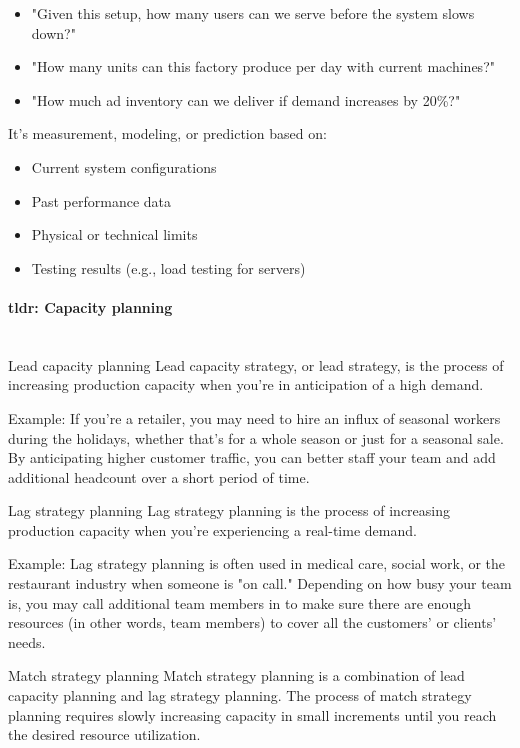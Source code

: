 \documentclass{article}
\begin{document}
\begin{itemize}
\item "Given this setup, how many users can we serve before the system slows down?"
\item "How many units can this factory produce per day with current machines?"
\item "How much ad inventory can we deliver if demand increases by 20\%?"
\end{itemize}

It's measurement, modeling, or prediction based on:

\begin{itemize}
\item Current system configurations
\item Past performance data
\item Physical or technical limits
\item Testing results (e.g., load testing for servers)
\end{itemize}

\paragraph{tldr: Capacity planning}~\\
Lead capacity planning
Lead capacity strategy, or lead strategy, is the process of increasing production capacity when you're in anticipation of a high demand. 

Example: If you’re a retailer, you may need to hire an influx of seasonal workers during the holidays, whether that’s for a whole season or just for a seasonal sale. By anticipating higher customer traffic, you can better staff your team and add additional headcount over a short period of time. 

Lag strategy planning
Lag strategy planning is the process of increasing production capacity when you’re experiencing  a real-time demand.

Example: Lag strategy planning is often used in medical care, social work, or the restaurant industry when someone is "on call." Depending on how busy your team is, you may call additional team members in to make sure there are enough resources (in other words, team members) to cover all the customers’ or clients’ needs. 

Match strategy planning
Match strategy planning is a combination of lead capacity planning and lag strategy planning. The process of match strategy planning requires slowly increasing capacity in small increments until you reach the desired resource utilization.
\end{document}
